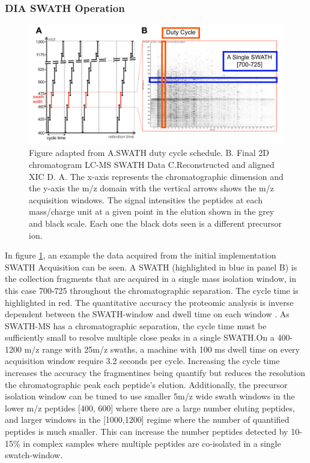 \documentclass[a4paper]{book}
\begin{document}
	\subsubsection{DIA SWATH Operation}
	\begin{figure}[t!]
		\centering
		\includegraphics[width=1.0\linewidth]{3.Proteomics/DIA_SWATH_Principle_1.pdf}
		\caption{Figure adapted from \citep{Rost2014OpenSWATHData} A.SWATH duty cycle schedule. B. Final 2D chromatogram LC-MS SWATH Data C.Reconstructed and aligned XIC D.  A. The x-axis represents the chromatographic dimension and the y-axis the m/z domain with the vertical arrows shows the m/z acquisition windows. The signal intensities the peptides at each mass/charge unit at a given point in the elution shown in the grey and black scale. Each one the black dots seen is  a different precursor ion.}
		\label{Deconvoluted MS2 Spectra}
	\end{figure}
	
	In figure \ref{Deconvoluted MS2 Spectra}, an example the data acquired from the initial implementation SWATH Acquisition can be seen. A SWATH (highlighted in blue in panel B) is the collection fragments that  are acquired in a single mass isolation window, in this case 700-725 throughout the chromatographic separation. The cycle time is highlighted in red. The quantitative accuracy the proteomic analysis is inverse dependent between the SWATH-window and dwell time on each window \citep{rost2017automated}. As SWATH-MS has a chromatographic separation, the cycle time must be sufficiently small to resolve multiple close peaks in a single SWATH.On a 400-1200 m/z range with 25m/z swaths, a machine with 100 ms dwell time on every acquisition window require 3.2 seconds per cycle. Increasing the cycle time increases the accuracy the fragmentines being quantify but reduces the resolution the chromatographic peak each peptide's elution\citep{Lange2008SelectedTutorial.}. Additionally, the precursor isolation window can be tuned to use smaller 5m/z wide swath windows in the lower m/z peptides [400, 600] where there are a large number eluting peptides, and larger windows in the [1000,1200] regime where the number of quantified peptides is much smaller. This can increase the number peptides detected by 10-15\% in complex samples where multiple peptides are co-isolated in a single swatch-window.
	
\end{document}
